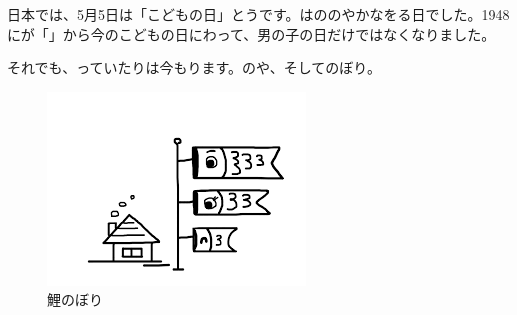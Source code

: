
\author{autor}

	
	\begin{bunshou}
		\hspace{15pt}日本では、5月5日は「こどもの日」とう\hspace{5pt}です。は\hspace{10pt}ののやかなを\hspace{10pt}る日でした。\hspace{5pt}1948にが「」から今のこどもの日にわって、男の子の日だけではなくなりました。
		
		それでも、\hspace{10pt}っていたりは今もります。\hspace{5pt}の\hspace{10pt}や\hspace{10pt}、そしてのぼり。
	\end{bunshou}

	\begin{figure}[h]
		\centering
		\includegraphics[width=.3\textwidth]{00x_citanje_tango_res/koinobori}
		\caption{鯉のぼり}
	\end{figure}
	
	\newpage
	
